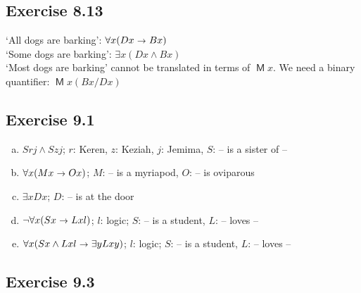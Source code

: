 \documentclass{scrartcl}
\let\oldto\to
\renewcommand\to{\scaleobj{0.95}{\,\oldto\,}}
\DeclareMathOperator{\Mostly}{\mathsf{M}}
\begin{document}
  \subsection*{Exercise 8.13}

%
%
  `All dogs are barking': $\forall x(Dx \to Bx)$\\
  `Some dogs are barking': $\exists x(Dx \land Bx)$\\
  `Most dogs are barking' cannot be translated in terms of $\Mostly x$. We need
  a binary quantifier: $\Mostly x(Bx / Dx)$

  \subsection*{Exercise 9.1}

%
%
  \begin{enumerate}[(a)]
  \item $Srj \land Szj$; \qquad $r$: Keren, $z$: Keziah, $j$: Jemima, $S$: -- is a sister of --
  \item $\forall x (Mx \to Ox)$; \qquad $M$: -- is a myriapod, $O$: -- is oviparous
  \item $\exists x Dx$; \qquad $D$: -- is at the door
  \item $\neg\forall x (Sx \to Lxl)$; \qquad $l$: logic; $S$: -- is a student, $L$: -- loves --
  \item $\forall x (Sx \land Lxl \to \exists y Lxy)$; \qquad $l$: logic; $S$: -- is a student, $L$: -- loves --
  \end{enumerate}


  \subsection*{Exercise 9.3}
\end{document}
